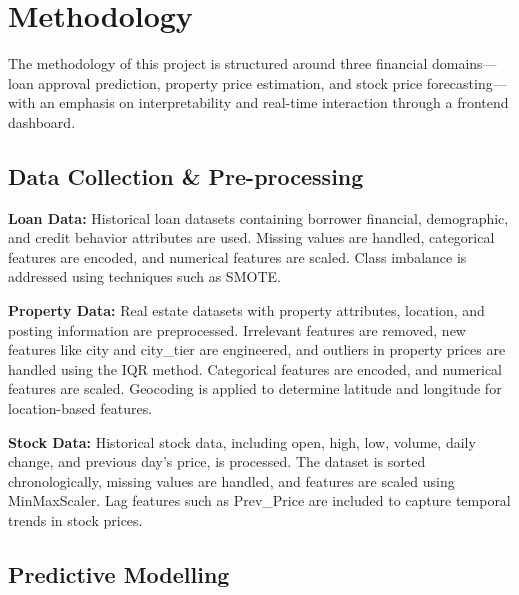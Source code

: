 
\section{Methodology}

The methodology of this project is structured around three financial domains---loan approval prediction, property price estimation, and stock price forecasting---with an emphasis on interpretability and real-time interaction through a frontend dashboard.

\subsection{Data Collection \& Pre-processing}

\textbf{Loan Data:} Historical loan datasets containing borrower financial, demographic, and credit behavior attributes are used. Missing values are handled, categorical features are encoded, and numerical features are scaled. Class imbalance is addressed using techniques such as SMOTE.

\textbf{Property Data:} Real estate datasets with property attributes, location, and posting information are preprocessed. Irrelevant features are removed, new features like city and city\_tier are engineered, and outliers in property prices are handled using the IQR method. Categorical features are encoded, and numerical features are scaled. Geocoding is applied to determine latitude and longitude for location-based features.

\textbf{Stock Data:} Historical stock data, including open, high, low, volume, daily change, and previous day's price, is processed. The dataset is sorted chronologically, missing values are handled, and features are scaled using MinMaxScaler. Lag features such as Prev\_Price are included to capture temporal trends in stock prices.

\subsection{Predictive Modelling}

